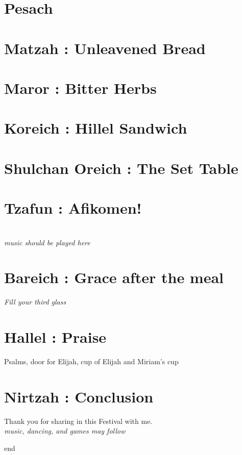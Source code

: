 \documentclass[a5paper,10pt]{memoir}
\begin{document}
\section{Pesach}

\section{Matzah : Unleavened Bread}
\HaMotzi
\Matzah

\section{Maror : Bitter Herbs}
\Maror

\section{Koreich : Hillel Sandwich}
\Koreich

\section{Shulchan Oreich : The Set Table}

\section{Tzafun : Afikomen!}
\\
\textit{music should be played here}

\section{Bareich : Grace after the meal}
\textit{Fill your third glass}
\BareichText
\Kaddeish

\section{Hallel : Praise}
Psalms, door for Elijah, cup of Elijah and Miriam’s cup

\Hallel
\Elijah
\Miriam
% 

\section{Nirtzah : Conclusion}
\Nirtzah
% 
Thank you for sharing in this Festival with me.\\
\textit{music, dancing, and games may follow}
\begin{center}
	{end}
\end{center}
\end{document}
